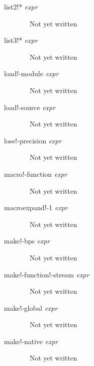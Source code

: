 \documentclass[a4paper,11pt]{article}
\begin{document}
\begin{description}
\item [{\ttfamily list2!*} {\itshape  expr}]  ~\newline
Not yet written

\item [{\ttfamily list3!*} {\itshape  expr}]  ~\newline
Not yet written

\item [{\ttfamily load!-module} {\itshape  expr}]  ~\newline
Not yet written

\item [{\ttfamily load!-source} {\itshape  expr}]  ~\newline
Not yet written

\item [{\ttfamily lose!-precision} {\itshape  expr}]  ~\newline
Not yet written

\item [{\ttfamily macro!-function} {\itshape  expr}]  ~\newline
Not yet written

\item [{\ttfamily macroexpand!-1} {\itshape  expr}]  ~\newline
Not yet written

\item [{\ttfamily make!-bps} {\itshape  expr}]  ~\newline
Not yet written

\item [{\ttfamily make!-function!-stream} {\itshape  expr}]  ~\newline
Not yet written

\item [{\ttfamily make!-global} {\itshape  expr}]  ~\newline
Not yet written

\item [{\ttfamily make!-native} {\itshape  expr}]  ~\newline
Not yet written


\end{description}
\end{document}
